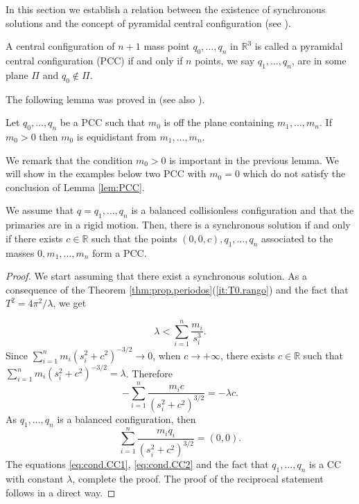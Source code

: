 \documentclass[smallcondensed]{svjour3}
\newcommand{\rr}{\mathbb{R}}
\begin{document}
In this section we establish a relation between the existence of synchronous solutions and the concept of pyramidal central configuration (see \cite{fayccal1996classification,faycaltesis,ouyang2004pyramidal}).

\begin{definition}
A central configuration of $n+1$ mass point $q_0,\ldots,q_{n}$ in $\rr^{3}$  is called a pyramidal central configuration (PCC) if and only if $n$ points, we say $q_1,\ldots,q_n$, are in some plane $\Pi$ and $q_{0}\notin \Pi$.
\end{definition}

The following lemma was proved in \cite{ouyang2004pyramidal} (see also \cite{faycaltesis}).
\begin{lemma}\label{lem:PCC}
 Let $q_0,\ldots,q_{n}$ be a PCC such that $m_{0}$ is off the plane containing $m_1,\ldots,m_n$. If $m_{0}>0$ then $m_{0}$ is equidistant from $m_1,\ldots,m_n$.
\end{lemma}

We remark that the condition $m_{0}>0$ is important in the previous lemma. We will show in the examples below two PCC with $m_{0}=0$ which do not satisfy the conclusion of  Lemma \ref{lem:PCC}.



\begin{proposition}\label{cor:sol.sincronica}
We assume that $q=q_1,\ldots,q_n$ is a balanced collisionless configuration and that the primaries are in a rigid motion. Then, there is a synchronous solution if and only if there exists $c\in \rr$ such that the points $(0,0,c),q_1,\ldots,q_{n}$ associated to the masses $0,m_1,\ldots,m_{n}$ form a PCC.
\end{proposition}

\begin{proof}
We start assuming that there exist a synchronous solution. As a consequence of the Theorem \ref{thm:prop.periodos}(\ref{it:T0.rango}) and the fact that $T^2=4\pi^2/\lambda$, we get

 \begin{equation}\label{eq:lamdbda<suma.si3}
\lambda<\sum_{i=1}^n\frac{m_i}{s_i^3}.
 \end{equation}
 Since $\sum_{i=1}^{n}m_i\left(s_i^2+c^2\right)^{-3/2}\to 0$, when $c\to +\infty$, there exists $c\in \rr$ such that
 $ \sum_{i=1}^{n}m_i\left(s_i^2+c^2\right)^{-3/2}=\lambda$. Therefore
 \begin{equation}\label{eq:cond.CC1}
  -\sum_{i=1}^{n}\frac{m_i c}{\left(s_i^2+c^2\right)^{3/2}}=-\lambda c.
 \end{equation}
As $q_1,\ldots,q_n$ is a balanced configuration, then
\begin{equation}\label{eq:cond.CC2}
   \sum_{i=1}^{n}\frac{m_i q_i}{\left(s_i^2+c^2\right)^{3/2}}= (0,0).
\end{equation}
The equations \eqref{eq:cond.CC1}, \eqref{eq:cond.CC2}  and the fact that $q_1,\ldots,q_n$ is a CC with constant $\lambda$, complete the proof.
The proof of the reciprocal statement follows in a direct way.
\end{proof}
\end{document}
